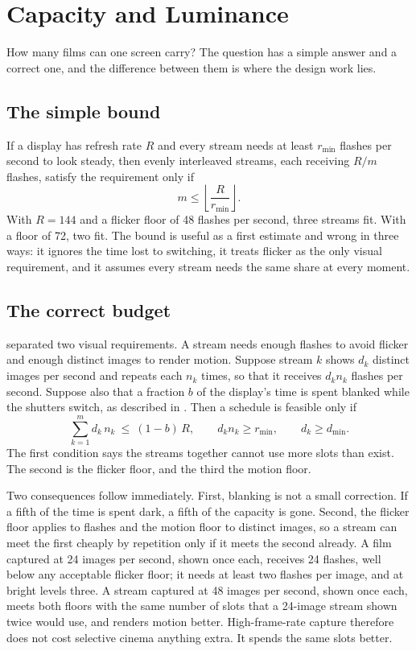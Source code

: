 \chapter{Capacity and Luminance}\label{ch:capacity}

How many films can one screen carry? The question has a simple answer and a correct one, and the difference between them is where the design work lies.

\section{The simple bound}

If a display has refresh rate $R$ and every stream needs at least $r_{\min}$ flashes per second to look steady, then evenly interleaved streams, each receiving $R/m$ flashes, satisfy the requirement only if
\begin{equation}
m\le\left\lfloor\frac{R}{r_{\min}}\right\rfloor.
\end{equation}
With $R=144$ and a flicker floor of 48 flashes per second, three streams fit. With a floor of 72, two fit. The bound is useful as a first estimate and wrong in three ways: it ignores the time lost to switching, it treats flicker as the only visual requirement, and it assumes every stream needs the same share at every moment.

\section{The correct budget}

 separated two visual requirements. A stream needs enough flashes to avoid flicker and enough distinct images to render motion. Suppose stream $k$ shows $d_k$ distinct images per second and repeats each $n_k$ times, so that it receives $d_kn_k$ flashes per second. Suppose also that a fraction $b$ of the display's time is spent blanked while the shutters switch, as described in . Then a schedule is feasible only if
\begin{equation}
\sum_{k=1}^{m} d_k\,n_k\ \le\ (1-b)\,R,
\qquad
d_kn_k\ge r_{\min},
\qquad
d_k\ge d_{\min}.
\end{equation}
The first condition says the streams together cannot use more slots than exist. The second is the flicker floor, and the third the motion floor.

Two consequences follow immediately. First, blanking is not a small correction. If a fifth of the time is spent dark, a fifth of the capacity is gone. Second, the flicker floor applies to flashes and the motion floor to distinct images, so a stream can meet the first cheaply by repetition only if it meets the second already. A film captured at 24 images per second, shown once each, receives 24 flashes, well below any acceptable flicker floor; it needs at least two flashes per image, and at bright levels three. A stream captured at 48 images per second, shown once each, meets both floors with the same number of slots that a 24-image stream shown twice would use, and renders motion better. High-frame-rate capture therefore does not cost selective cinema anything extra. It spends the same slots better.

